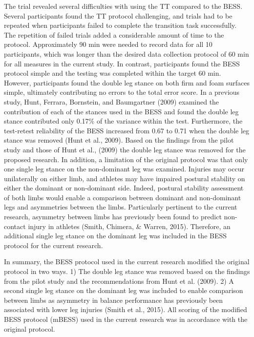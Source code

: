 \documentclass[man,floatsintext]{apa6}
\begin{document}
The trial revealed several difficulties with using the TT compared to the BESS.
Several participants found the TT protocol challenging, and trials had to be repeated when participants failed to complete the transition task successfully.
The repetition of failed trials added a considerable amount of time to the protocol.
Approximately 90 min were needed to record data for all 10 participants, which was longer than the desired data collection protocol of 60 min for all measures in the current study.
In contrast, participants found the BESS protocol simple and the testing was completed within the target 60 min.
However, participants found the double leg stance on both firm and foam surfaces simple, ultimately contributing no errors to the total error score.
In a previous study, Hunt, Ferrara, Bornstein, and Baumgartner (2009) examined the contribution of each of the stances used in the BESS and found the double leg stance contributed only 0.17\% of the variance within the test.
Furthermore, the test-retest reliability of the BESS increased from 0.67 to 0.71 when the double leg stance was removed (Hunt et al., 2009).
Based on the findings from the pilot study and those of Hunt et al., (2009) the double leg stance was removed for the proposed research.
In addition, a limitation of the original protocol was that only one single leg stance on the non-dominant leg was examined.
Injuries may occur unilaterally on either limb, and athletes may have impaired postural stability on either the dominant or non-dominant side.
Indeed, postural stability assessment of both limbs would enable a comparison between dominant and non-dominant legs and asymmetries between the limbs.
Particularly pertinent to the current research, asymmetry between limbs has previously been found to predict non-contact injury in athletes (Smith, Chimera, \& Warren, 2015).
Therefore, an additional single leg stance on the dominant leg was included in the BESS protocol for the current research.

In summary, the BESS protocol used in the current research modified the original protocol in two ways. 1) The double leg stance was removed based on the findings from the pilot study and the recommendations from Hunt et al. (2009). 2) A second single leg stance on the dominant leg was included to enable comparison between limbs as asymmetry in balance performance has previously been associated with lower leg injuries (Smith et al., 2015).
All scoring of the modified BESS protocol (mBESS) used in the current research was in accordance with the original protocol.
\end{document}
